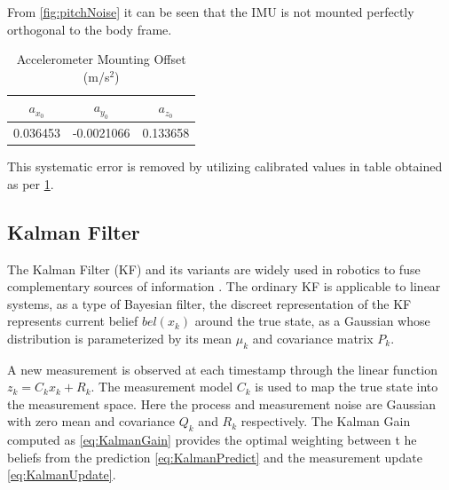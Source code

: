         From \ref{fig:pitchNoise} it can be seen that the IMU is not mounted perfectly orthogonal to the body frame. 
        \begin{table}[H]
            \centering
            \begin{tabular}{c c c} 
                \toprule
                $a_{x_0}$ & $a_{y_0}$ & $a_{z_0}$ \\
                \midrule
                0.036453 & -0.0021066 & 0.133658 \\
                \bottomrule

            \end{tabular}
            \caption{Accelerometer Mounting Offset (m/s$^{2}$)}
            \label{tab:accelOffset}
        \end{table}
        This systematic error is removed by utilizing calibrated values in table obtained as per \ref{tab:accelOffset}.
        
        
        \pagebreak{}
        \subsection{Kalman Filter}
        The Kalman Filter (KF) and its variants  are widely used in robotics to fuse 
        complementary sources of information \cite{Thrun2005ProbabilisticRobotics} \cite{perez2023quadcopter} \cite{Moore2014AGE}.
        The ordinary KF is applicable to linear systems, as a type of Bayesian filter, 
        the discreet representation of the KF represents current belief $bel(x_k)$ around the true state,
        as a Gaussian whose distribution is parameterized by its mean $\mu_k$ and covariance matrix $P_k$.

        A new measurement is observed at each timestamp through the linear function $z_k = C_k x_k + R_k$. 
        The measurement model $C_k$ is used to map the true state into the measurement space.
        Here the process and measurement noise are Gaussian with zero mean and covariance $Q_k$ and $R_k$ respectively. 
        The Kalman Gain computed as \ref{eq:KalmanGain} provides the optimal weighting between t
        he beliefs from the prediction \ref{eq:KalmanPredict} and the measurement update \ref{eq:KalmanUpdate}.
        

